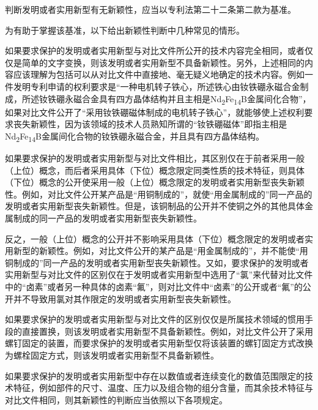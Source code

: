 判断发明或者实用新型有无新颖性，应当以专利法第二十二条第二款为基准。

为有助于掌握该基准，以下给出新颖性判断中几种常见的情形。

如果要求保护的发明或者实用新型与对比文件所公开的技术内容完全相同，或者仅仅是简单的文字变换，则该发明或者实用新型不具备新颖性。另外，上述相同的内容应该理解为包括可以从对比文件中直接地、毫无疑义地确定的技术内容。例如一件发明专利申请的权利要求是“一种电机转子铁心，所述铁心由钕铁硼永磁合金制成，所述钕铁硼永磁合金具有四方晶体结构并且主相是Nd\textsubscript{2}Fe\textsubscript{14}B金属间化合物”，如果对比文件公开了“采用钕铁硼磁体制成的电机转子铁心”，就能够使上述权利要求丧失新颖性，因为该领域的技术人员熟知所谓的“钕铁硼磁体”即指主相是Nd\textsubscript{2}Fe\textsubscript{14}B金属间化合物的钕铁硼永磁合金，并且具有四方晶体结构。

如果要求保护的发明或者实用新型与对比文件相比，其区别仅在于前者采用一般（上位）概念，而后者采用具体（下位）概念限定同类性质的技术特征，则具体（下位）概念的公开使采用一般（上位）概念限定的发明或者实用新型丧失新颖性。例如，对比文件公开某产品是“用铜制成的”，就使“用金属制成的”同一产品的发明或者实用新型丧失新颖性。但是，该铜制品的公开并不使铜之外的其他具体金属制成的同一产品的发明或者实用新型丧失新颖性。

反之，一般（上位）概念的公开并不影响采用具体（下位）概念限定的发明或者实用新型的新颖性。例如，对比文件公开的某产品是“用金属制成的”，并不能使“用铜制成的”同一产品的发明或者实用新型丧失新颖性。又如，要求保护的发明或者实用新型与对比文件的区别仅在于发明或者实用新型中选用了“氯”来代替对比文件中的“卤素”或者另一种具体的卤素“氟”，则对比文件中“卤素”的公开或者“氟”的公开并不导致用氯对其作限定的发明或者实用新型丧失新颖性。

如果要求保护的发明或者实用新型与对比文件的区别仅仅是所属技术领域的惯用手段的直接置换，则该发明或者实用新型不具备新颖性。例如，对比文件公开了采用螺钉固定的装置，而要求保护的发明或者实用新型仅将该装置的螺钉固定方式改换为螺栓固定方式，则该发明或者实用新型不具备新颖性。

如果要求保护的发明或者实用新型中存在以数值或者连续变化的数值范围限定的技术特征，例如部件的尺寸、温度、压力以及组合物的组分含量，而其余技术特征与对比文件相同，则其新颖性的判断应当依照以下各项规定。


